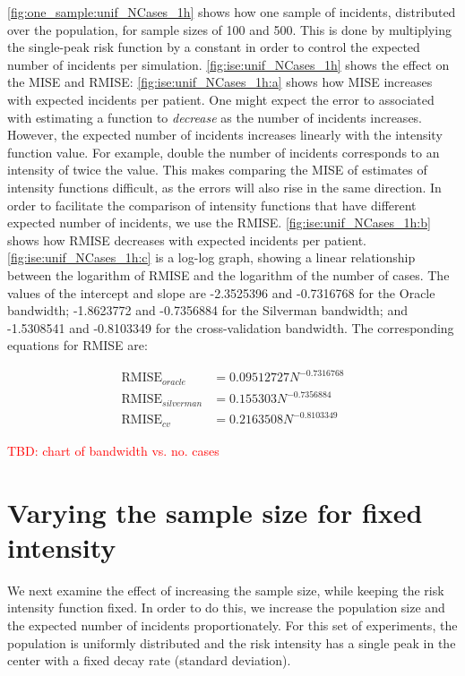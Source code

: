 \autoref{fig:one_sample:unif_NCases_1h} shows how one sample of incidents, distributed over the population, for sample sizes of 100 and 500.
This is done by multiplying the single-peak risk function by a constant in order to control the expected number of incidents per simulation.
\autoref{fig:ise:unif_NCases_1h} shows the effect on the MISE and RMISE:
\autoref{fig:ise:unif_NCases_1h:a} shows how MISE increases with expected incidents per patient.
One might expect the error to associated with estimating a function to \textit{decrease} as the number of incidents increases.
However, the expected number of incidents increases linearly with the intensity function value.
For example, double the number of incidents corresponds to an intensity of twice the value.
This makes comparing the MISE of estimates of intensity functions difficult, as the errors will also rise in the same direction.
In order to facilitate the comparison of intensity functions that have different expected number of incidents, we use the RMISE.
\autoref{fig:ise:unif_NCases_1h:b} shows how RMISE decreases with expected incidents per patient.
\autoref{fig:ise:unif_NCases_1h:c} is a log-log graph, showing a linear relationship between the logarithm of RMISE and the logarithm of the number of cases.
The values of the intercept and slope are -2.3525396 and -0.7316768 for the Oracle bandwidth; -1.8623772 and -0.7356884 for the Silverman bandwidth; and -1.5308541 and -0.8103349 for the cross-validation bandwidth.
The corresponding equations for RMISE are:

\begin{align}
    \mbox{RMISE}_{oracle} &= 0.09512727 N^{-0.7316768} \\
    \mbox{RMISE}_{silverman} &= 0.155303 N^{-0.7356884} \\
    \mbox{RMISE}_{cv} &= 0.2163508 N^{-0.8103349}
\end{align}

\textcolor{red}{TBD: chart of bandwidth vs. no. cases}

\section{Varying the sample size for fixed intensity}
\label{sec:results:unifNpop_1h}

We next examine the effect of increasing the sample size, while keeping the risk intensity function fixed.
In order to do this, we increase the population size and the expected number of incidents proportionately.
For this set of experiments, the population is uniformly distributed and the risk intensity has a single peak in the center with a fixed decay rate (standard deviation).

